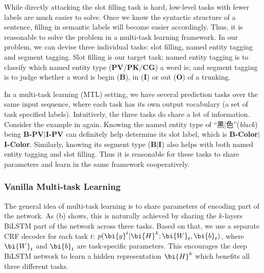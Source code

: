 While directly attacking the slot filling task is hard,
low-level tasks with fewer labels are much easier to solve.
Once we know the syntactic structure of a sentence,
filling in semantic labels will become easier accordingly.
Thus, it is reasonable to solve the problem in a multi-task learning 
framework.
In our problem, we can devise three individual tasks: slot filling, named entity tagging and segment tagging.
Slot filling is our target task;
named entity tagging is to classify which named entity type (\textbf{PV}/\textbf{PK}/\textbf{CG}) a word is;
and segment tagging is to judge 
whether a word is begin (\textbf{B}), in (\textbf{I}) or out (\textbf{O}) of a trunking.

In a multi-task learning (MTL) setting, 
we have several prediction tasks over the same input sequence,
where each task has its own output vocabulary (a set of task 
specified labels).
Intuitively, the three tasks do share a lot of information.
Consider the example in  again. 
Knowing the named entity type of ``黑$|$色''(\emph{black}) being 
\textbf{B-PV}$|$\textbf{I-PV}
can definitely help determine its slot label, 
which is \textbf{B-Color}$|$\textbf{I-Color}.
Similarly, knowing its segment type (\textbf{B}$|$\textbf{I}) 
also helps with both named entity tagging and slot filling.
Thus it is reasonable for these tasks to share parameters
and learn in the same framework cooperatively.

\subsubsection{Vanilla Multi-task Learning}
The general idea of multi-task learning
is to share parameters of encoding part of the network.
As (b) shows,
this is naturally achieved by sharing 
the $k$-layers BiLSTM part of the network across three tasks.
Based on that,
we use a separate CRF decoder for each task $t$:
$p(\bi{y}^t|\bi{H}^k;\bi{W}_t, \bi{b}_t)$,
where $\bi{W}_t$ and $\bi{b}_t$ are task-specific parameters.
This encourages the deep BiLSTM network 
to learn a hidden representation $\bi{H}^k$
which benefits all three different tasks.


